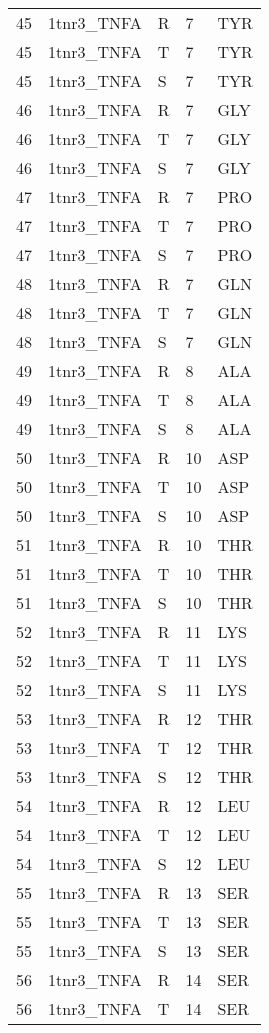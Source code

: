 \begin{longtable}[l]{l|l|l|l|l}
	45 & 1tnr3_TNFA & R & 7 & TYR \\
	45 & 1tnr3_TNFA & T & 7 & TYR \\
	45 & 1tnr3_TNFA & S & 7 & TYR \\
	46 & 1tnr3_TNFA & R & 7 & GLY \\
	46 & 1tnr3_TNFA & T & 7 & GLY \\
	46 & 1tnr3_TNFA & S & 7 & GLY \\
	47 & 1tnr3_TNFA & R & 7 & PRO \\
	47 & 1tnr3_TNFA & T & 7 & PRO \\
	47 & 1tnr3_TNFA & S & 7 & PRO \\
	48 & 1tnr3_TNFA & R & 7 & GLN \\
	48 & 1tnr3_TNFA & T & 7 & GLN \\
	48 & 1tnr3_TNFA & S & 7 & GLN \\
	49 & 1tnr3_TNFA & R & 8 & ALA \\
	49 & 1tnr3_TNFA & T & 8 & ALA \\
	49 & 1tnr3_TNFA & S & 8 & ALA \\
	50 & 1tnr3_TNFA & R & 10 & ASP \\
	50 & 1tnr3_TNFA & T & 10 & ASP \\
	50 & 1tnr3_TNFA & S & 10 & ASP \\
	51 & 1tnr3_TNFA & R & 10 & THR \\
	51 & 1tnr3_TNFA & T & 10 & THR \\
	51 & 1tnr3_TNFA & S & 10 & THR \\
	52 & 1tnr3_TNFA & R & 11 & LYS \\
	52 & 1tnr3_TNFA & T & 11 & LYS \\
	52 & 1tnr3_TNFA & S & 11 & LYS \\
	53 & 1tnr3_TNFA & R & 12 & THR \\
	53 & 1tnr3_TNFA & T & 12 & THR \\
	53 & 1tnr3_TNFA & S & 12 & THR \\
	54 & 1tnr3_TNFA & R & 12 & LEU \\
	54 & 1tnr3_TNFA & T & 12 & LEU \\
	54 & 1tnr3_TNFA & S & 12 & LEU \\
	55 & 1tnr3_TNFA & R & 13 & SER \\
	55 & 1tnr3_TNFA & T & 13 & SER \\
	55 & 1tnr3_TNFA & S & 13 & SER \\
	56 & 1tnr3_TNFA & R & 14 & SER \\
	56 & 1tnr3_TNFA & T & 14 & SER \\

\end{longtable}
